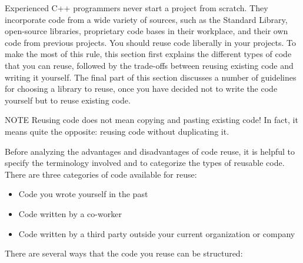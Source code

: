 
Experienced C++ programmers never start a project from scratch. They incorporate code from a wide variety of sources, such as the Standard Library, open-source libraries, proprietary code bases in their workplace, and their own code from previous projects. You should reuse code liberally in your projects. To make the most of this rule, this section first explains the different types of code that you can reuse, followed by the trade-offs between reusing existing code and writing it yourself. The final part of this section discusses a number of guidelines for choosing a library to reuse, once you have decided not to write the code yourself but to reuse existing code.

\begin{myNotic}{NOTE}
Reusing code does not mean copying and pasting existing code! In fact, it means quite the opposite: reusing code without duplicating it.
\end{myNotic}


Before analyzing the advantages and disadvantages of code reuse, it is helpful to specify the terminology involved and to categorize the types of reusable code. There are three categories of code available for reuse:

\begin{itemize}
\item
Code you wrote yourself in the past

\item
Code written by a co-worker

\item
Code written by a third party outside your current organization or company
\end{itemize}

There are several ways that the code you reuse can be structured:

